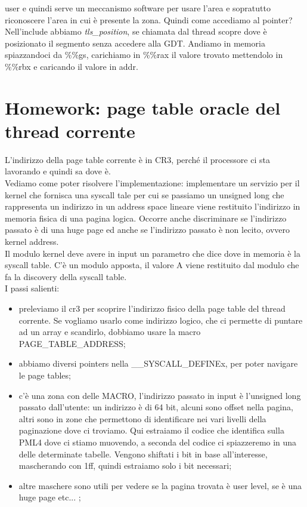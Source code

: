 \documentclass[12pt, oneside]{extbook}
\begin{document}
user e quindi serve un meccanismo software per usare l'area e sopratutto riconoscere l'area in cui è presente la zona. Quindi come accediamo al pointer? Nell'include abbiamo \textit{tls\_position}, se chiamata dal thread scopre dove è posizionato il segmento senza accedere alla GDT. Andiamo in memoria spiazzandoci da \%\%gs, carichiamo in \%\%rax il valore trovato mettendolo in \%\%rbx e caricando il valore in addr.
\section*{Homework: page table oracle del thread corrente}
L'indirizzo della page table corrente è in CR3, perché il processore ci sta lavorando e quindi sa dove è.\\ Vediamo come poter risolvere l'implementazione: implementare un servizio per il kernel che fornisca una syscall tale per cui se passiamo un unsigned long che rappresenta un indirizzo in un address space lineare viene restituito l'indirizzo in memoria fisica di una pagina logica. Occorre anche discriminare se l'indirizzo passato è di una huge page ed anche se l'indirizzo passato è non lecito, ovvero kernel address.\\ Il modulo kernel deve avere in input un parametro che dice dove in memoria è la syscall table. C'è un modulo apposta, il valore A viene restituito dal modulo che fa la discovery della syscall table.\\ I passi salienti:
\begin{itemize}
\item preleviamo il cr3 per scoprire l'indirizzo fisico della page table del thread corrente. Se vogliamo usarlo come indirizzo logico, che ci permette di puntare ad un array e scandirlo, dobbiamo usare la macro \textsf{PAGE\_TABLE\_ADDRESS};
\item abbiamo diversi pointers nella \_\_SYSCALL\_DEFINEx, per poter navigare le page tables;
\item c'è una zona con delle MACRO, l'indirizzo passato in input è l'unsigned long passato dall'utente: un indirizzo è di 64 bit, alcuni sono offset nella pagina, altri sono in zone che permettono di identificare nei vari livelli della paginazione dove ci troviamo. Qui estraiamo il codice che identifica sulla PML4 dove ci stiamo muovendo, a seconda del codice ci spiazzeremo in una delle determinate tabelle. Vengono shiftati i bit in base all'interesse, mascherando con 1ff, quindi estraiamo solo i bit necessari;
\item altre maschere sono utili per vedere se la pagina trovata è user level, se è una huge page etc... ;
\end{itemize}
\end{document}
